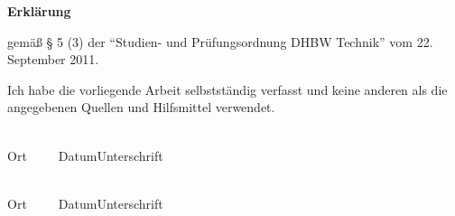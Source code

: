 


\newpage
\thispagestyle{empty}
\begin{framed}
\begin{center}
\Large\bfseries \textsf{Erklärung}
\end{center}

\noindent
gemäß § 5 (3) der "`Studien- und Prüfungsordnung DHBW Technik"' vom 22. September 2011. 


\noindent
Ich habe die vorliegende Arbeit selbstständig verfasst und keine anderen als die angegebenen
Quellen und Hilfsmittel verwendet.

\vspace{3cm}
\noindent
\underline{\hspace{4cm}}\hfill\underline{\hspace{6cm}}\\
Ort~~~~~Datum\hfill Unterschrift\hspace{3.85cm}

\vspace{1cm}
\noindent
\underline{\hspace{4cm}}\hfill\underline{\hspace{6cm}}\\
Ort~~~~~Datum\hfill Unterschrift\hspace{3.85cm}


%
%
%

\end{framed}



\endinput
